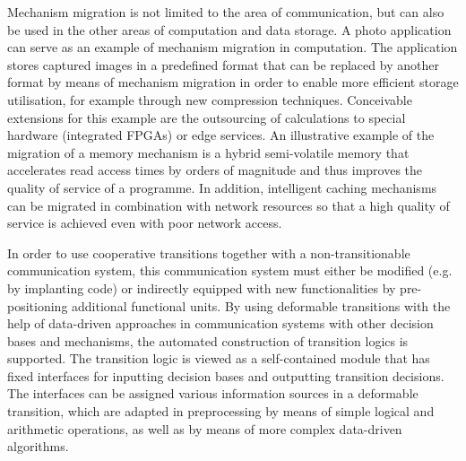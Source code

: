 Mechanism migration is not limited to the area of communication, but can also be used in the other areas of computation and data storage.
A photo application can serve as an example of mechanism migration in computation.
The application stores captured images in a predefined format that can be replaced by another format by means of mechanism migration in order to enable more efficient storage utilisation, for example through new compression techniques. 
Conceivable extensions for this example are the outsourcing of calculations to special hardware (integrated FPGAs) or edge services.
An illustrative example of the migration of a memory mechanism is a hybrid semi-volatile memory that accelerates read access times by orders of magnitude and thus improves the quality of service of a programme. 
In addition, intelligent caching mechanisms can be migrated in combination with network resources so that a high quality of service is achieved even with poor network access. 

In order to use cooperative transitions together with a non-transitionable communication system, this communication system must either be modified (e.g. by implanting code) or indirectly equipped with new functionalities by pre-positioning additional functional units. 
By using deformable transitions with the help of data-driven approaches in communication systems with other decision bases and mechanisms, the automated construction of transition logics is supported. 
The transition logic is viewed as a self-contained module that has fixed interfaces for inputting decision bases and outputting transition decisions.
The interfaces can be assigned various information sources in a deformable transition, which are adapted in preprocessing by means of simple logical and arithmetic operations, as well as by means of more complex data-driven algorithms.
